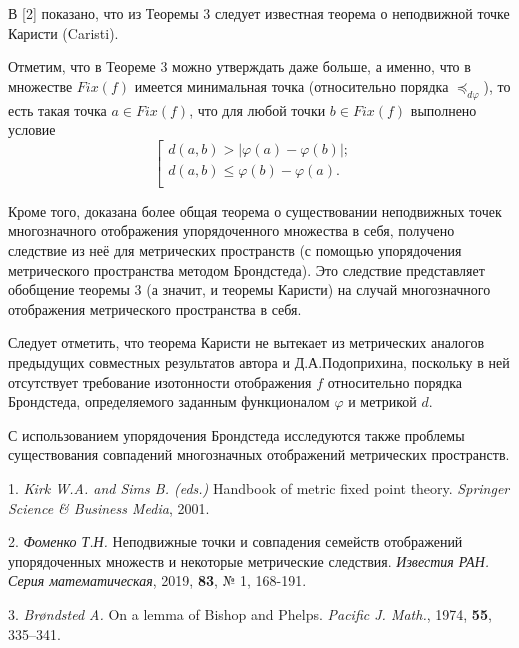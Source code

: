 В [2] показано, что  из Теоремы 3 следует известная теорема о неподвижной точке Каристи (Caristi).

Отметим, что в Теореме 3 можно утверждать даже больше, а именно, что в множестве $Fix(f)$ имеется минимальная точка (относительно порядка $\preceq_{d\varphi}$), то есть такая точка $a\in Fix(f)$, что для любой точки $b\in Fix(f)$ выполнено условие
$$
\left [\begin{array}{rl}d(a,b)>|\varphi(a)-\varphi(b)|;&
\\d(a,b)\le\varphi(b)-\varphi(a).\\
\end{array}
\right.
$$

Кроме того, доказана более общая теорема о существовании неподвижных точек многозначного отображения упорядоченного множества в себя, получено следствие из неё для  метрических пространств (с помощью упорядочения метрического пространства методом Брондстеда). Это следствие представляет обобщение теоремы 3 (а значит, и теоремы Каристи) на случай многозначного отображения метрического пространства в себя.

Следует отметить, что теорема Каристи не вытекает из метрических аналогов предыдущих совместных результатов автора и Д.А.Подоприхина, поскольку в ней отсутствует требование изотонности отображения $f$ относительно порядка Брондстеда, определяемого заданным функционалом $\varphi$ и метрикой $d$.

С использованием упорядочения Брондстеда исследуются также проблемы существования совпадений многозначных отображений метрических пространств.

\litlist

1. {\it Kirk W.A. and  Sims B. (eds.)} Handbook of metric fixed point theory. {\it Springer Science \& Business Media},  2001.

2. {\it Фоменко Т.Н.}  Неподвижные точки и совпадения семейств отображений упорядоченных множеств и некоторые метрические следствия. {\it Известия РАН. Серия математическая}, 2019, {\bf 83}, № 1, 168-191.

3. {\it  Br\o ndsted A.} On a lemma of Bishop and Phelps. {\it Pacific J. Math.}, 1974, {\bf 55}, 335--341.
